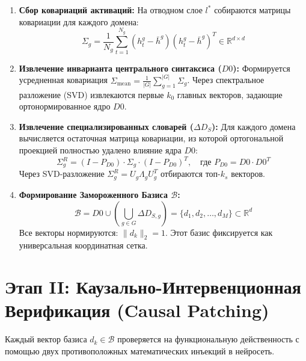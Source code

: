 \documentclass[11pt,a4paper]{article}
\begin{document}
\begin{enumerate}
    \item \textbf{Сбор ковариаций активаций:} На отводном слое $l^*$ собираются матрицы ковариации для каждого домена:
    \begin{equation}
    \Sigma_g = \frac{1}{N_g} \sum_{t=1}^{N_g} (h_t^g - \bar{h}^g)(h_t^g - \bar{h}^g)^T \in \mathbb{R}^{d \times d}
    \end{equation}
    
    \item \textbf{Извлечение инварианта центрального синтаксиса ($D0$):} Формируется усредненная ковариация $\Sigma_{\text{mean}} = \frac{1}{|G|} \sum_{g=1}^{|G|} \Sigma_g$. Через спектральное разложение (SVD) извлекаются первые $k_0$ главных векторов, задающие ортонормированное ядро $D0$.
    
    \item \textbf{Извлечение специализированных словарей ($\Delta D_S$):} Для каждого домена вычисляется остаточная матрица ковариации, из которой ортогональной проекцией полностью удалено влияние ядра $D0$:
    \begin{equation}
    \Sigma_g^R = (I - P_{D0}) \cdot \Sigma_g \cdot (I - P_{D0})^T, \quad \text{где } P_{D0} = D0 \cdot D0^T
    \end{equation}
    Через SVD-разложение $\Sigma_g^R = U_g \Lambda_g U_g^T$ отбираются топ-$k_s$ векторов.
    
    \item \textbf{Формирование Замороженного Базиса $\mathcal{B}$:}
    \begin{equation}
    \mathcal{B} = D0 \cup \left( \bigcup_{g \in G} \Delta D_{S, g} \right) = \{d_1, d_2, \dots, d_M\} \subset \mathbb{R}^d
    \end{equation}
    Все векторы нормируются: $\|d_k\|_2 = 1$. Этот базис фиксируется как универсальная координатная сетка.
\end{enumerate}

\section{Этап II: Каузально-Интервенционная Верификация (Causal Patching)}

Каждый вектор базиса $d_k \in \mathcal{B}$ проверяется на функциональную действенность с помощью двух противоположных математических инъекций в нейросеть.
\end{document}
